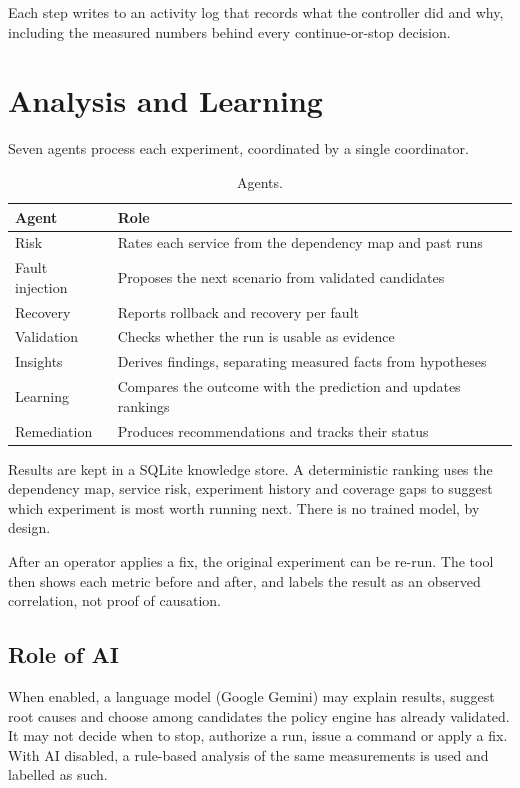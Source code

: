 \documentclass[11pt,a4paper]{article}
\begin{document}
Each step writes to an activity log that records what the controller did and
why, including the measured numbers behind every continue-or-stop decision.

\section{Analysis and Learning}

Seven agents process each experiment, coordinated by a single coordinator.

\begin{table}[h]
\centering
\begin{tabularx}{\textwidth}{@{}lL@{}}
\toprule
\textbf{Agent} & \textbf{Role} \\
\midrule
Risk & Rates each service from the dependency map and past runs \\
Fault injection & Proposes the next scenario from validated candidates \\
Recovery & Reports rollback and recovery per fault \\
Validation & Checks whether the run is usable as evidence \\
Insights & Derives findings, separating measured facts from hypotheses \\
Learning & Compares the outcome with the prediction and updates rankings \\
Remediation & Produces recommendations and tracks their status \\
\bottomrule
\end{tabularx}
\caption{Agents.}
\end{table}

Results are kept in a SQLite knowledge store. A deterministic ranking uses the
dependency map, service risk, experiment history and coverage gaps to suggest
which experiment is most worth running next. There is no trained model, by
design.

After an operator applies a fix, the original experiment can be re-run. The
tool then shows each metric before and after, and labels the result as an
observed correlation, not proof of causation.

\subsection{Role of AI}

When enabled, a language model (Google Gemini) may explain results, suggest
root causes and choose among candidates the policy engine has already
validated. It may not decide when to stop, authorize a run, issue a command or
apply a fix. With AI disabled, a rule-based analysis of the same measurements
is used and labelled as such.
\end{document}
